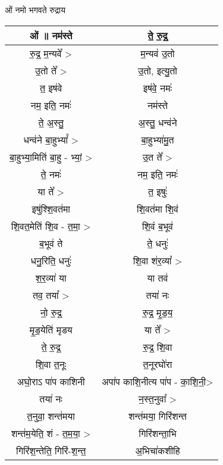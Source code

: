 \subsection{}
ओं नमो भगवते रुद्राय
{\centering
\begin{longtable}{|c|c|}
\hline
ओं ॥  नम॑स्ते                & ते॒ रु॒द्र॒\\
\hline
रु॒द्र॒ म॒न्यवे᳚ >               & म॒न्यव॑ उ॒तो\\
\hline
उ॒तो ते᳚ >                  & उ॒तो, इत्यु॒तो\\
\hline
त॒ इष॑वे                    & इष॑वे॒ नमः॑\\
\hline
नम॒ इति॒ नमः॑               & नम॑स्ते\\
\hline
ते॒ अ॒स्तु॒                    & अ॒स्तु॒ धन्व॑ने\\
\hline
धन्व॑ने बा॒हुभ्यां᳚ >            & बा॒हुभ्या॑मु॒त\\
\hline
बा॒हुभ्या॒मिति॑ बा॒हु - भ्यां॒ >   & उ॒त ते᳚ >\\
\hline
ते॒ नमः॑                    & नम॒ इति॒ नमः॑\\
\hline
या ते᳚ >                   & त॒ इषुः॑\\
\hline
इषु॑श्शि॒वत॑मा                & शि॒वत॑मा शि॒वं\\
\hline
शि॒वत॒मेति॑ शि॒व - त॒मा॒ >      & शि॒वं ब॒भूव॑\\
\hline
ब॒भूव॑ ते                    & ते॒ धनुः॑\\
\hline
धनु॒रिति॒ धनुः॑               & शि॒वा श॑र॒व्या᳚ >\\
\hline
श॒र॒व्या॑ या                 & या तव॑\\
\hline
तव॒ तया᳚ >                 & तया॑ नः\\
\hline
नो॒ रु॒द्र॒                   & रु॒द्र॒ मृ॒ड॒य॒\\
\hline
मृ॒ड॒येति॑ मृडय                & या ते᳚ >\\
\hline
ते॒ रु॒द्र॒                    & रु॒द्र॒ शि॒वा\\
\hline
शि॒वा त॒नूः                 & त॒नूरघो॑रा\\
\hline
अघो॒राऽ पा॑प काशिनी         & अपा॑प काशि॒नीत्य पा॑प - का॒शि॒नी॒>\\
\hline
तया॑ नः                   & न॒स्त॒नुवा᳚ >\\
\hline
त॒नुवा॒ शन्त॑मया              & शन्त॑मया॒ गिरि॑शन्त\\
\hline
शन्त॑म॒येति॒ शं - त॒म॒या॒ >       & गिरि॑शन्ता॒भि\\
\hline
गिरि॑श॒न्तेति॒ गिरि॑-श॒न्त॒       & अ॒भिचा॑कशीहि\\

\end{longtable}}
